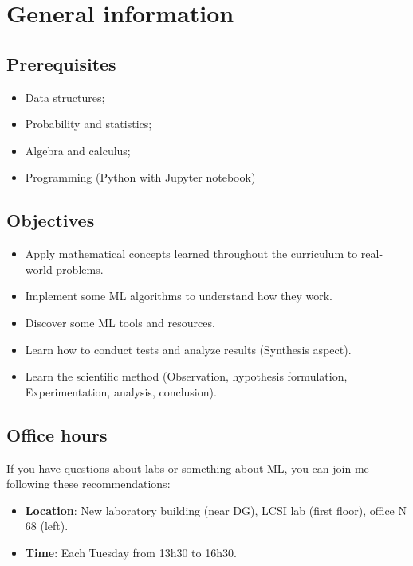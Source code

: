 \documentclass[11pt, a4paper]{article}
\begin{document}
\section{General information}

\begin{minipage}{0.49\textwidth}

\subsection{Prerequisites}

\begin{itemize}
	\item Data structures;
	\item Probability and statistics;
	\item Algebra and calculus;
	\item Programming (Python with Jupyter notebook)
\end{itemize}
\end{minipage}
\begin{minipage}{0.49\textwidth}
	
\subsection{Objectives}

\begin{itemize}
	\item Apply mathematical concepts learned throughout the curriculum to real-world problems.
	\item Implement some ML algorithms to understand how they work.
	\item Discover some ML tools and resources.
	\item Learn how to conduct tests and analyze results (Synthesis aspect).
	\item Learn the scientific method (Observation, hypothesis formulation, Experimentation, analysis, conclusion).
\end{itemize}

\end{minipage}

\subsection{Office hours}

If you have questions about labs or something about ML, you can join me following these recommendations:
\begin{itemize}
	\item \textbf{Location}: New laboratory building (near DG), LCSI lab (first floor), office N 68 (left).
	\item \textbf{Time}: Each Tuesday from 13h30 to 16h30.
\end{itemize}
\end{document}
